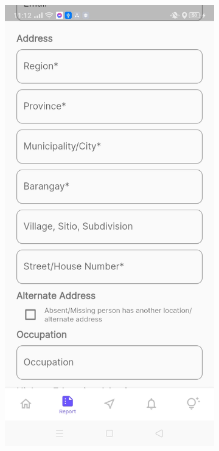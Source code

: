 \begin{figure}[!h]
\begin{subfigure}[c]{0.30\linewidth}
        \centering
        \includegraphics[scale=0.15]{figures/Chapter4/Main/p3-3.jpg}
    \end{subfigure}
    \centering
    \begin{subfigure}[c]{0.30\linewidth}

\end{subfigure}
\end{figure}

